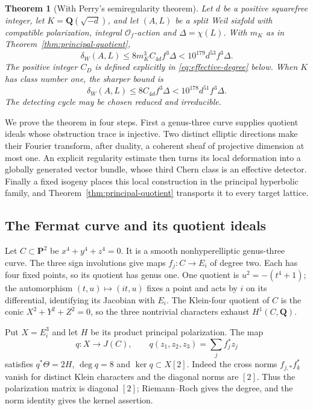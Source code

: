 \documentclass[11pt]{article}
\newtheorem{theorem}{Theorem}[section]
\theoremstyle{definition}
\theoremstyle{remark}
\newcommand{\Q}{\mathbf Q}
\begin{document}
\begin{theorem}[With Perry's semiregularity theorem]\label{thm:all-field-sixfolds}
Let $d$ be a positive squarefree integer, let $K=\Q(\sqrt{-d})$, and let $(A,L)$ be a split Weil sixfold with compatible polarization, integral $\mathcal O_f$-action and $\Delta=\chi(L)$. With $m_K$ as in Theorem~\ref{thm:principal-quotient},
\[
 \delta_W(A,L)\le8m_K^3 C_{4d} f^3\Delta
             <10^{179}d^{53}f^3\Delta.
\]
The positive integer $C_D$ is defined explicitly in \eqref{eq:effective-degree} below. When $K$ has class number one, the sharper bound is
\[
 \delta_W(A,L)\le8C_{4d}f^3\Delta
                  <10^{178}d^{51}f^3\Delta.
\]
The detecting cycle may be chosen reduced and irreducible.
\end{theorem}

We prove the theorem in four steps. First a genus-three curve supplies quotient ideals whose obstruction trace is injective. Two distinct elliptic directions make their Fourier transform, after duality, a coherent sheaf of projective dimension at most one. An explicit regularity estimate then turns its local deformation into a globally generated vector bundle, whose third Chern class is an effective detector. Finally a fixed isogeny places this local construction in the principal hyperbolic family, and Theorem~\ref{thm:principal-quotient} transports it to every target lattice.

\subsection{The Fermat curve and its quotient ideals}
Let $C\subset\mathbf P^2$ be $x^4+y^4+z^4=0$. It is a smooth nonhyperelliptic genus-three curve. The three sign involutions give maps $f_j:C\to E_i$ of degree two. Each has four fixed points, so its quotient has genus one. One quotient is $u^2=-(t^4+1)$; the automorphism $(t,u)\mapsto(it,u)$ fixes a point and acts by $i$ on its differential, identifying its Jacobian with $E_i$. The Klein-four quotient of $C$ is the conic $X^2+Y^2+Z^2=0$, so the three nontrivial characters exhaust $H^1(C,\Q)$.

Put $X=E_i^3$ and let $H$ be its product principal polarization. The map
\[
 q:X\longrightarrow J(C),\qquad q(z_1,z_2,z_3)=\sum_j f_j^*z_j
\]
satisfies $q^*\Theta=2H$, $\deg q=8$ and $\ker q\subset X[2]$. Indeed the cross norms $f_{j,*}f_k^*$ vanish for distinct Klein characters and the diagonal norms are $[2]$. Thus the polarization matrix is diagonal $[2]$; Riemann--Roch gives the degree, and the norm identity gives the kernel assertion.
\end{document}
